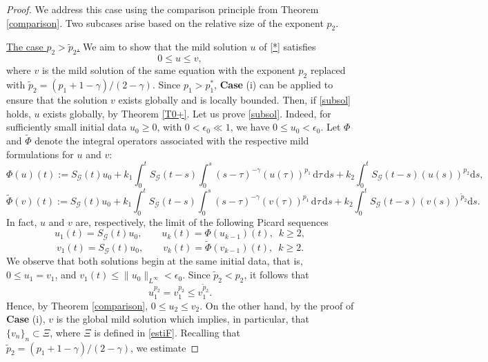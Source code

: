 \documentclass[a4,psfig,english,12pt,epsf,portrait]{article}
\numberwithin{equation}{section}
\begin{document}
\begin{proof}
	 We address this case using the comparison principle from Theorem \ref{comparison}. Two subcases arise based on the relative size of the exponent $p_2$.
	
	
	
	\underline{The case $p_2> \tilde{p}_2$.}  We aim to show that the mild solution $u$ of \eqref{*} satisfies 
	\begin{equation}\label{subsol}
		0\leq u\leq v,
	\end{equation} 
	where $v$ is the mild solution of the same equation with the exponent $p_2$ replaced with $\tilde{p}_2=(p_1+1-\gamma)/(2-\gamma)$. Since $p_1>p_1^{*}$, {\bf Case} (i) can be applied to ensure that the solution $v$ exists globally and is locally bounded. Then, if \eqref{subsol} holds, $u$ exists globally, by Theorem \ref{T0+}. Let us prove \eqref{subsol}. Indeed, for sufficiently small initial data $u_0\geq0$, with $0<\epsilon_0\ll1$, we have $0\leq u_0<\epsilon_0$. Let $\Phi$ and $\tilde{\Phi}$ denote the integral operators associated with the respective mild formulations for $u$ and $v$: 
	$$\Phi(u)(t):=S_{\mathcal{G}}(t)u_0 +k_1 \int_{0}^{t}S_{\mathcal{G}}(t-s) \int_0^s(s-\tau)^{-\gamma}(u(\tau))^{p_1}\, \mathrm{d}\tau \,\mathrm{d}s +k_2 \int_{0}^{t}S_{\mathcal{G}}(t-s)(u(s))^{p_2} \mathrm{d}s,$$
	$$\tilde{\Phi}(v)(t):=S_{\mathcal{G}}(t)u_0 +k_1 \int_{0}^{t}S_{\mathcal{G}}(t-s) \int_0^s(s-\tau)^{-\gamma}(v(\tau))^{p_1}\, \mathrm{d}\tau \,\mathrm{d}s +k_2 \int_{0}^{t}S_{\mathcal{G}}(t-s)(v(s))^{\tilde{p}_2} \mathrm{d}s.$$
	In fact, $u$ and $v$ are, respectively, the limit of the following Picard sequences
	\begin{equation} \label{pic1A}
		u_{1}(t) =S_\mathcal{G}(t)u_0 ,\qquad u_{k}(t) = \Phi (u_{k-1})(t),\,\,\,k\geq2 , 
	\end{equation}
	\begin{equation} \label{pic12A}
		v_{1}(t) =S_\mathcal{G}(t)u_0 ,\qquad	 v_{k}(t) = \tilde{\Phi} (v_{k-1})(t),\,\,\, k\geq2 .
	\end{equation}
	We observe that both solutions begin at the same initial data, that is, $0\leq u_1= v_1$, and $v_1(t) \leq \|u_0\|_{L^\infty}<\epsilon_0$. Since $\tilde{p}_2<p_2$, it follows that 
	$$u_1^{p_2}=v_1^{p_2}\leq  v_1^{\tilde{p}_2}.$$ 
	Hence, by Theorem \ref{comparison}, $0\leq u_2\leq v_2$. On the other hand, by the proof of {\bf Case} (i), $v$ is the global mild solution which implies, in particular, that $\{v_n\}_n\subset\Xi$, where $\Xi$ is defined in \eqref{estiF}. Recalling that $\tilde{p}_2=(p_1+1-\gamma)/(2-\gamma)$,  we estimate

\end{proof}
\end{document}
